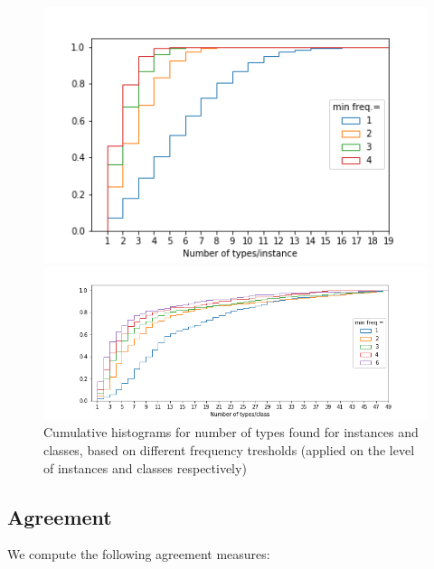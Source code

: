 \begin{figure}
\begin{minipage}[b]{0.4\linewidth}
\includegraphics[scale=.4]{figures/types_instances.png}
\end{minipage}
\begin{minipage}[b]{0.6\linewidth}
\includegraphics[scale=.4]{figures/types_classes.png}
\end{minipage}
 \caption{\label{fig:ntypes} Cumulative histograms for number of types found for instances and classes, based on different frequency tresholds (applied on the level of instances and classes respectively)}
\end{figure}


\subsection{Agreement}

We compute the following agreement measures:

